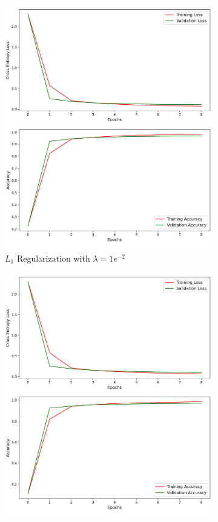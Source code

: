 \begin{figure}[H]
	\begin{subfigure}{0.5\textwidth}
		\centering
		\includegraphics[width=1.0\textwidth]{./images/l1_e2.png}
		\caption{$L_1$ Regularization with $\lambda = 1e^{-2}$}
		\label{fig:l1_1e2}
	\end{subfigure}
	\begin{subfigure}{0.5\textwidth}
		\centering
		\includegraphics[width=1.0\textwidth]{./images/l1_e4.png}

\end{subfigure}
\end{figure}
